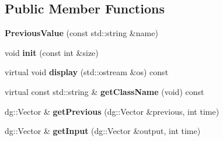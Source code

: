 \subsection*{Public Member Functions}
\begin{DoxyCompactItemize}
\item 
{\bfseries Previous\+Value} (const std\+::string \&name)\hypertarget{classdg__tools_1_1PreviousValue_a829ab1d9ddeed58307e669c3716d7adc}{}\label{classdg__tools_1_1PreviousValue_a829ab1d9ddeed58307e669c3716d7adc}

\item 
void {\bfseries init} (const int \&size)\hypertarget{classdg__tools_1_1PreviousValue_ac84ba4e47fd88946279439cc8d9a255f}{}\label{classdg__tools_1_1PreviousValue_ac84ba4e47fd88946279439cc8d9a255f}

\item 
virtual void {\bfseries display} (std\+::ostream \&os) const \hypertarget{classdg__tools_1_1PreviousValue_a5e7f1792ed7f5b43a5bb5cd6f2be9ef6}{}\label{classdg__tools_1_1PreviousValue_a5e7f1792ed7f5b43a5bb5cd6f2be9ef6}

\item 
virtual const std\+::string \& {\bfseries get\+Class\+Name} (void) const \hypertarget{classdg__tools_1_1PreviousValue_ac053765749bc6e92e81b0f0cc6d7c792}{}\label{classdg__tools_1_1PreviousValue_ac053765749bc6e92e81b0f0cc6d7c792}

\item 
dg\+::\+Vector \& {\bfseries get\+Previous} (dg\+::\+Vector \&previous, int time)\hypertarget{classdg__tools_1_1PreviousValue_a3a27aa9156c258ee6222f8212eb0d1e5}{}\label{classdg__tools_1_1PreviousValue_a3a27aa9156c258ee6222f8212eb0d1e5}

\item 
dg\+::\+Vector \& {\bfseries get\+Input} (dg\+::\+Vector \&output, int time)\hypertarget{classdg__tools_1_1PreviousValue_a034d2baec32ec23757f21a82b99e8d72}{}\label{classdg__tools_1_1PreviousValue_a034d2baec32ec23757f21a82b99e8d72}

\end{DoxyCompactItemize}
